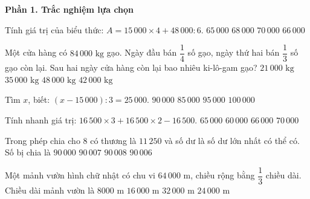 \textbf{Phần 1. Trắc nghiệm lựa chọn}

\begin{ex} %
Tính giá trị của biểu thức: $A = 15\,000 \times 4 + 48\,000 : 6$.
\choice
{$65\,000$}
{\True $68\,000$}
{$70\,000$}
{$66\,000$}
\end{ex}

\begin{ex} %
Một cửa hàng có $84\,000\text{ kg}$ gạo. Ngày đầu bán $\dfrac{1}{4}$ số gạo, ngày thứ hai bán $\dfrac{1}{3}$ số gạo còn lại. Sau hai ngày cửa hàng còn lại bao nhiêu ki-lô-gam gạo?
\choice
{$21\,000\text{ kg}$}
{$35\,000\text{ kg}$}
{$48\,000\text{ kg}$}
{\True $42\,000\text{ kg}$}
\end{ex}

\begin{ex} %
Tìm $x$, biết: $(x - 15\,000) : 3 = 25\,000$.
\choice
{\True $90\,000$}
{$85\,000$}
{$95\,000$}
{$100\,000$}
\end{ex}

\begin{ex} %
Tính nhanh giá trị: $16\,500 \times 3 + 16\,500 \times 2 - 16\,500$.
\choice
{$65\,000$}
{$60\,000$}
{\True $66\,000$}
{$70\,000$}
\end{ex}

\begin{ex} %
Trong phép chia cho 8 có thương là $11\,250$ và số dư là số dư lớn nhất có thể có. Số bị chia là
\choice
{$90\,000$}
{\True $90\,007$}
{$90\,008$}
{$90\,006$}
\end{ex}

\begin{ex} %
Một mảnh vườn hình chữ nhật có chu vi $64\,000\text{ m}$, chiều rộng bằng $\dfrac{1}{3}$ chiều dài. Chiều dài mảnh vườn là
\choice
{$8000\text{ m}$}
{$16\,000\text{ m}$}
{$32\,000\text{ m}$}
{\True $24\,000\text{ m}$}
\end{ex}

